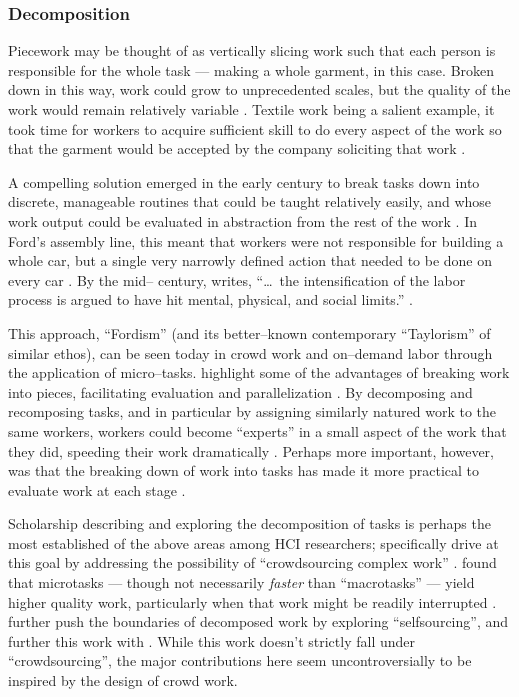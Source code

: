 \documentclass[trackingWork]{subfiles}
\begin{document}
{\subsubsection{Decomposition}\label{sec:decomposition}
Piecework may be thought of as vertically slicing work such that 
each person is responsible for the whole task
--- making a whole garment, in this case.
Broken down in this way, work could grow to unprecedented scales,
but the quality of the work would remain relatively variable
\cite{murray1983decentralisation}.
Textile work being a salient example,
it took time for workers to acquire sufficient skill
to do every aspect of the work so that the garment would be accepted by the company soliciting that work
\cite{vezina1992light}.

A compelling solution emerged in the early  century to break tasks down into discrete,
manageable routines that could be taught relatively easily,
and whose work output could be evaluated in abstraction from the rest of the work
\cite{restructuringPieceworkBaker}.
In Ford's assembly line, this meant that workers were not responsible for building a whole car,
but a single very narrowly defined action that needed to be done on every car
\cite{towardsGlobalFordism}.
By the mid-- century, \citeauthor{schoenberger1988fordism} writes,
``\dots~the intensification of the labor process is argued to have hit mental, physical, and social limits.''
\cite{schoenberger1988fordism}.


This approach, ``Fordism'' (and its better--known contemporary ``Taylorism'' of similar ethos),
can be seen today in crowd work and on--demand labor through the application of micro--tasks.
\citeauthor{writingMicroTasks} highlight some of the advantages of breaking work into pieces,
facilitating evaluation and parallelization
\cite{writingMicroTasks}.
By decomposing and recomposing tasks,
and in particular by assigning similarly natured work to the same workers,
workers could become ``experts'' in a small aspect of the work that they did,
speeding their work dramatically
\cite{delayAndOrderLasecki}.
Perhaps more important, however, was that
the breaking down of work into tasks has made it more practical to evaluate work at each stage
\cite{rogstadius2011assessment}.

Scholarship describing and exploring
the decomposition of tasks is perhaps the most established of the above areas among HCI researchers;
\citeauthor{crowdForgeKittur} specifically drive at this goal by addressing the possibility of
``crowdsourcing complex work''
\cite{crowdForgeKittur}.
\citeauthor{cheng2015break} found that microtasks
--- though not necessarily \textit{faster} than ``macrotasks'' ---
yield higher quality work,
particularly when that work might be readily interrupted
\cite{cheng2015break}.
\citeauthor{selfsourcingTeevan2014} further push the boundaries of decomposed work
by exploring ``selfsourcing'', and further this work with \citeauthor{selfsourcingTeevan2016}
\cite{selfsourcingTeevan2014,selfsourcingTeevan2016}.
While this work doesn't strictly fall under ``crowdsourcing'',
the major contributions here
seem uncontroversially to be inspired by the design of crowd work.

}
\end{document}
